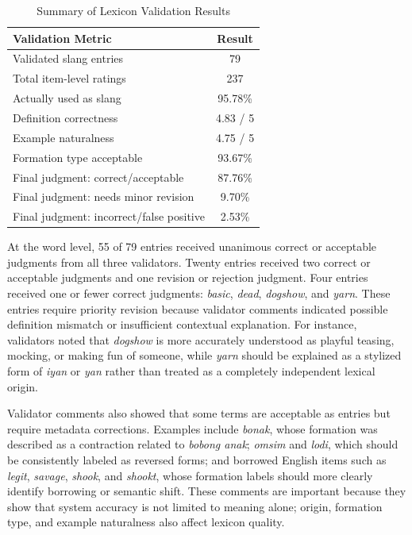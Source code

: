 \begin{table}[!t]
\centering
\caption{Summary of Lexicon Validation Results}
\label{tab:lexicon-validation}
\scriptsize
\setlength{\tabcolsep}{4pt}
\begin{tabular}{lc}
\toprule
\textbf{Validation Metric} & \textbf{Result} \\
\midrule
Validated slang entries & 79 \\
Total item-level ratings & 237 \\
Actually used as slang & 95.78\% \\
Definition correctness & 4.83 / 5 \\
Example naturalness & 4.75 / 5 \\
Formation type acceptable & 93.67\% \\
Final judgment: correct/acceptable & 87.76\% \\
Final judgment: needs minor revision & 9.70\% \\
Final judgment: incorrect/false positive & 2.53\% \\
\bottomrule
\end{tabular}
\end{table}

At the word level, 55 of 79 entries received unanimous correct or acceptable judgments from all three validators. Twenty entries received two correct or acceptable judgments and one revision or rejection judgment. Four entries received one or fewer correct judgments: \textit{basic}, \textit{dead}, \textit{dogshow}, and \textit{yarn}. These entries require priority revision because validator comments indicated possible definition mismatch or insufficient contextual explanation. For instance, validators noted that \textit{dogshow} is more accurately understood as playful teasing, mocking, or making fun of someone, while \textit{yarn} should be explained as a stylized form of \textit{iyan} or \textit{yan} rather than treated as a completely independent lexical origin.

Validator comments also showed that some terms are acceptable as entries but require metadata corrections. Examples include \textit{bonak}, whose formation was described as a contraction related to \textit{bobong anak}; \textit{omsim} and \textit{lodi}, which should be consistently labeled as reversed forms; and borrowed English items such as \textit{legit}, \textit{savage}, \textit{shook}, and \textit{shookt}, whose formation labels should more clearly identify borrowing or semantic shift. These comments are important because they show that system accuracy is not limited to meaning alone; origin, formation type, and example naturalness also affect lexicon quality.

